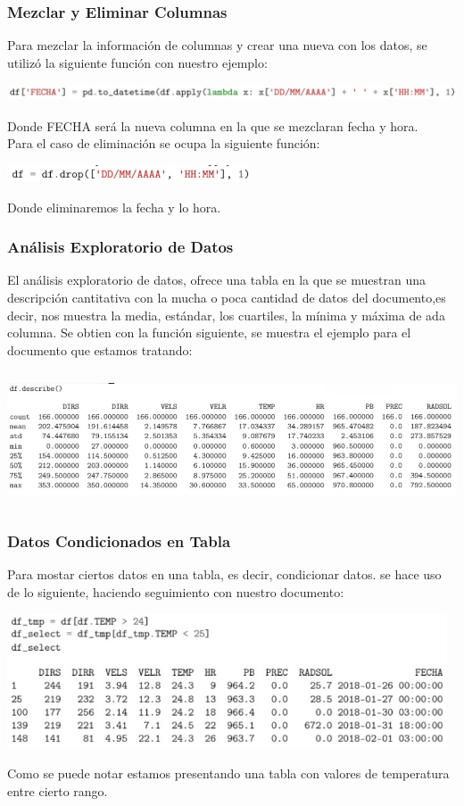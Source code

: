 \documentclass[12pt]{article}
\begin{document}
\subsubsection{Mezclar y Eliminar Columnas}
Para mezclar la información de columnas y crear una nueva con los datos, se utilizó la siguiente función con nuestro ejemplo:
 \begin{center}
	\includegraphics[height=0.5cm]{mez.jpg}
\end{center}
Donde FECHA será la nueva columna en la que se mezclaran fecha y hora.\\
Para el caso de eliminación se ocupa la siguiente función:
 \begin{center}
	\includegraphics[height=0.5cm]{el.jpg}
\end{center}
Donde eliminaremos la fecha y lo hora.

\subsubsection{Análisis Exploratorio de Datos}
El análisis exploratorio de datos, ofrece una tabla en la que se muestran una descripción cantitativa con la mucha o poca cantidad de datos del documento,es decir, nos muestra la media, estándar, los cuartiles, la mínima y máxima de ada columna. Se obtien con la función siguiente, se muestra el ejemplo para el documento que estamos tratando:
 \begin{center}
	\includegraphics[height=4cm]{expl.jpg}
\end{center}

\subsubsection{Datos Condicionados en Tabla}
Para mostar ciertos datos en una tabla, es decir, condicionar datos. se hace uso de lo siguiente, haciendo seguimiento con nuestro documento:
\begin{center}
	\includegraphics[height=4cm]{condi.jpg}
\end{center}
Como se puede notar estamos presentando una tabla con valores de temperatura entre cierto rango.
\end{document}
